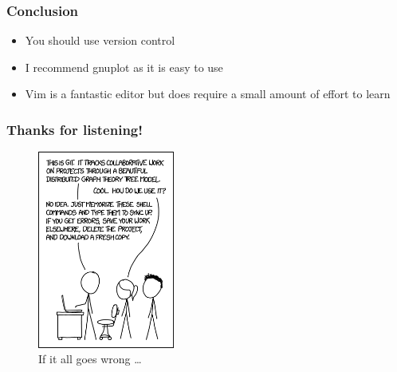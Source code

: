 \documentclass{beamer}
\begin{document}
\begin{frame}
    \frametitle{Conclusion}
    \begin{itemize}
    \item You should use version control
    \item I recommend gnuplot as it is easy to use
    \item Vim is a fantastic editor but does require a small amount of effort to learn
    \end{itemize}
\end{frame}


\begin{frame}
\frametitle{Thanks for listening!}
\begin{figure}[H]
	\centering
	\includegraphics[width=0.4\textwidth]{xkcdgit.png}
	\caption{If it all goes wrong \ldots \footnotemark }
	\label{fig:xkcdversion}
\end{figure}
\end{frame}
\end{document}
